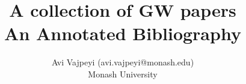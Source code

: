 \documentclass [11pt]{article}
\title{A collection of GW papers\\\medskip An Annotated Bibliography}
\author{Avi Vajpeyi (avi.vajpeyi@monash.edu)\\Monash University}
\begin{document}
\maketitle
\nocite{*}


\end{document}
